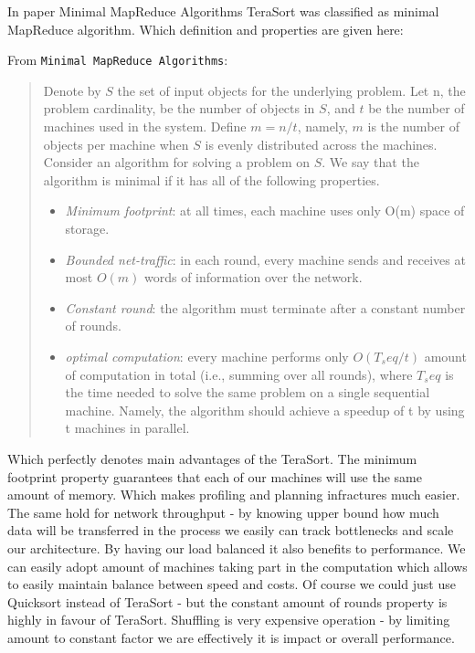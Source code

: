 In paper Minimal MapReduce Algorithms TeraSort was classified as
minimal MapReduce algorithm. Which definition and properties are given
here:

From \texttt{Minimal MapReduce Algorithms}:
\begin{quote}
Denote by $S$ the set of input objects 
for the underlying problem. Let n, the problem cardinality,
be the number of objects in $S$, and $t$ be the number of machines
used in the system. Define $m = n/t$, namely, $m$ is the number
of objects per machine when $S$ is evenly distributed across the
machines. Consider an algorithm for solving a problem on $S$.
We say that the algorithm is minimal if it has all of the following
properties.

\begin{itemize}
\item \emph{Minimum footprint}: at all times, each machine uses only
O(m) space of storage.
\item \emph{Bounded net-traffic}: in each round, every machine sends
and receives at most $O(m)$ words of information over the
network.
\item  \emph{Constant round}: the algorithm must terminate after a
constant number of rounds.
\item \emph{optimal computation}: every machine performs only
$O(T_seq /t)$ amount of computation in total (i.e., summing
over all rounds), where $T_seq$ is the time needed to solve the
same problem on a single sequential machine. Namely, the
algorithm should achieve a speedup of t by using t machines
in parallel. 
\end{itemize}
\end{quote}


Which perfectly denotes main advantages of the TeraSort. The minimum footprint property guarantees
that each of our machines will use the same amount of memory. Which makes profiling
and planning infractures much easier. The same hold for network throughput - by knowing
upper bound how much data will be transferred in the process we easily can track bottlenecks
and scale our architecture.
By having our load balanced it also benefits to performance. We can easily adopt amount of machines
taking part in the computation which allows to easily maintain balance between speed and costs.
Of course we could just use Quicksort instead of TeraSort - but the constant amount of rounds property
is highly in favour of TeraSort. Shuffling is very expensive operation - by limiting amount to constant
factor we are effectively it is impact or overall performance.


